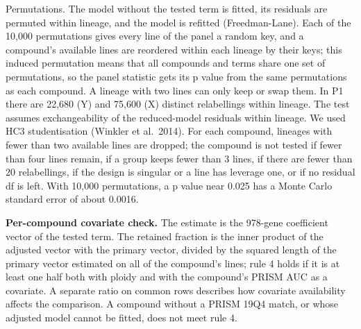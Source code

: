 \documentclass[
  11pt,
  letterpaper,
]{article}
\begin{document}
Permutations. The model without the tested term is fitted, its residuals
are permuted within lineage, and the model is refitted (Freedman-Lane).
Each of the 10,000 permutations gives every line of the panel a random
key, and a compound's available lines are reordered within each lineage
by their keys; this induced permutation means that all compounds and
terms share one set of permutations, so the panel statistic gets its p
value from the same permutations as each compound. A lineage with two
lines can only keep or swap them. In P1 there are 22,680 (Y) and 75,600
(X) distinct relabellings within lineage. The test assumes
exchangeability of the reduced-model residuals within lineage. We used
HC3 studentisation (Winkler et al.~2014). For each compound, lineages
with fewer than two available lines are dropped; the compound is not
tested if fewer than four lines remain, if a group keeps fewer than 3
lines, if there are fewer than 20 relabellings, if the design is
singular or a line has leverage one, or if no residual df is left. With
10,000 permutations, a p value near 0.025 has a Monte Carlo standard
error of about 0.0016.

\textbf{Per-compound covariate check.} The estimate is the 978-gene
coefficient vector of the tested term. The retained fraction is the
inner product of the adjusted vector with the primary vector, divided by
the squared length of the primary vector estimated on all of the
compound's lines; rule 4 holds if it is at least one half both with
ploidy and with the compound's PRISM AUC as a covariate. A separate
ratio on common rows describes how covariate availability affects the
comparison. A compound without a PRISM 19Q4 match, or whose adjusted
model cannot be fitted, does not meet rule 4.
\end{document}
